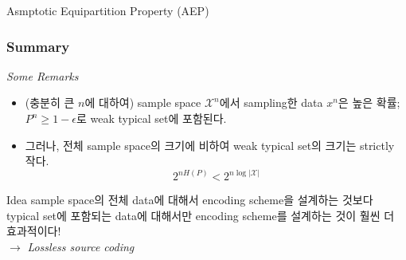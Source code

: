 \documentclass[9pt]{beamer}
\begin{document}
\begin{section}{Asmptotic Equipartition Property (AEP)}
        \begin{frame}
            \frametitle{Summary }
            \textit{Some Remarks}
            \begin{itemize}
                \item (충분히 큰 $n$에 대하여) sample space $\mathcal X^n$에서 sampling한 data $x^n$은 높은 확률; $P^n \ge 1-\epsilon$로 weak typical set에 포함된다. 
                \item 그러나, 전체 sample space의 크기에 비하여 weak typical set의 크기는 strictly 작다.
                $$ 2^{n H(P)} < 2^{n \log |\mathcal X|} $$
            \end{itemize}
            \vspace{0.2cm}
            \begin{block}{Idea}
                sample space의 전체 data에 대해서 encoding scheme을 설계하는 것보다 typical set에 포함되는 data에 대해서만 encoding scheme를 설계하는 것이 훨씬 더 효과적이다! 
                \\ $\rightarrow$ \textit{Lossless source coding}
            \end{block}
        \end{frame}
    \end{section}
\end{document}
